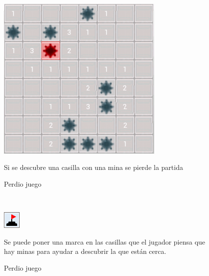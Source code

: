 \ \\ 
\begin{figure}[htbp]
\begin{center}
\includegraphics[width=.45\textwidth]{./imagenes/minas.png}
\caption{Perdio juego}
\end{center}
Si se descubre una casilla con una mina se pierde la partida
\end{figure}
\ \\ 
\begin{figure}[htbp]
\begin{center}
\includegraphics[width=.35\textwidth]{./imagenes/casilla_bandera.png}
\caption{Perdio juego}
\end{center}
Se puede poner una marca en las casillas que el jugador piensa que hay minas para ayudar a descubrir la que están cerca.
\end{figure}
\ \\ 

